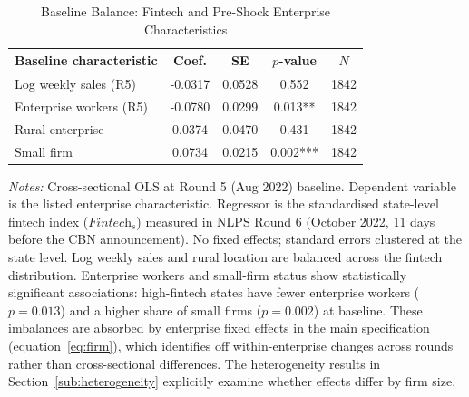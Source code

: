 \begin{table}[H]
\begin{threeparttable}
\caption{Baseline Balance: Fintech and Pre-Shock Enterprise Characteristics}
\label{atab:balance}
\small\begin{tabular}{lcccc}
\toprule
Baseline characteristic & Coef. & SE & $p$-value & $N$ \\
\midrule
Log weekly sales (R5) & -0.0317 & 0.0528 & 0.552 & 1842 \\
Enterprise workers (R5) & -0.0780 & 0.0299 & 0.013** & 1842 \\
Rural enterprise & 0.0374 & 0.0470 & 0.431 & 1842 \\
Small firm & 0.0734 & 0.0215 & 0.002*** & 1842 \\
\bottomrule
\end{tabular}
\begin{tablenotes}\footnotesize
\item \textit{Notes:} Cross-sectional OLS at Round 5 (Aug 2022) baseline. Dependent variable is the listed enterprise characteristic. Regressor is the standardised state-level fintech index ($\textit{Fintech}_s$) measured in NLPS Round 6 (October 2022, 11 days before the CBN announcement). No fixed effects; standard errors clustered at the state level. Log weekly sales and rural location are balanced across the fintech distribution. Enterprise workers and small-firm status show statistically significant associations: high-fintech states have fewer enterprise workers ($p = 0.013$) and a higher share of small firms ($p = 0.002$) at baseline. These imbalances are absorbed by enterprise fixed effects in the main specification (equation~\ref{eq:firm}), which identifies off within-enterprise changes across rounds rather than cross-sectional differences. The heterogeneity results in Section~\ref{sub:heterogeneity} explicitly examine whether effects differ by firm size.
\end{tablenotes}\end{threeparttable}\end{table}
